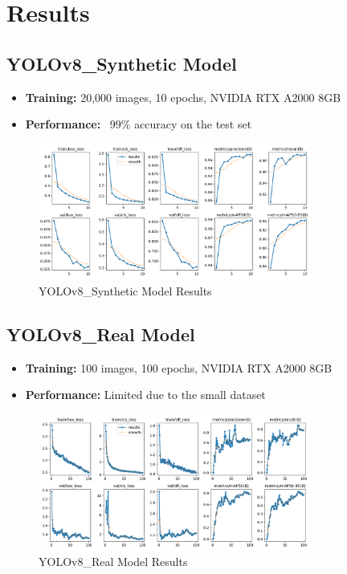 \documentclass{article}
\begin{document}
\newpage
\section{Results}

\subsection{YOLOv8\_Synthetic Model}
\begin{itemize}
  \item \textbf{Training:} 20,000 images, 10 epochs, NVIDIA RTX A2000 8GB
  \item \textbf{Performance:} ~99\% accuracy on the test set
\end{itemize}

\begin{figure}[htbp]
  \centering
  \includegraphics[width=0.8\textwidth]{./media/yolov8_synthetic_results.png}
  \caption{YOLOv8\_Synthetic Model Results}
  \label{fig:synthetic_results}
\end{figure}

\subsection{YOLOv8\_Real Model}
\begin{itemize}
  \item \textbf{Training:} 100 images, 100 epochs, NVIDIA RTX A2000 8GB
  \item \textbf{Performance:} Limited due to the small dataset
\end{itemize}
\begin{figure}[htbp]
  \centering
  \includegraphics[width=0.8\textwidth]{./media/yolov8_real_results.png}
  \caption{YOLOv8\_Real Model Results}
  \label{fig:real_results}
\end{figure}
\end{document}
